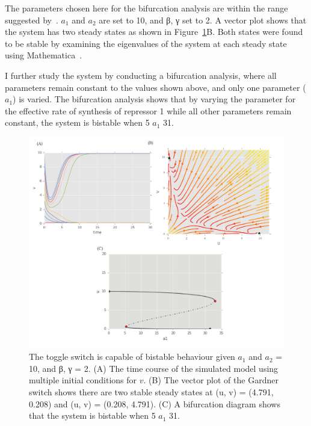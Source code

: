 The parameters chosen here for the bifurcation analysis are within the range suggested by~\textcite{Gardner:2000vha}.  $a_1$ and $a_2$ are set to 10, and β, γ set to 2. A vector plot shows that the system has two steady states as shown in Figure~\ref{fig:Gard_CS}B. Both states were found to be stable by examining the eigenvalues of the system at each steady state using Mathematica~\autocite{mathematica:2016}.


I further study the system by conducting a bifurcation analysis, where all parameters remain constant to the values shown above, and only one parameter ($a_1$) is varied. The bifurcation analysis shows that by varying the parameter for the effective rate of synthesis of repressor 1 while all other parameters remain constant, the system is bistable when 5 \ge{} $a_1$ \le{} 31.



\begin{figure}[htbp]
\centerfloat
\includegraphics[scale=0.7]{../../chapters/chapterABCSysBio/images/Gard_CS.pdf}
\caption[Phase space and bifurcation analysis of the Gardner toggle switch]{\label{fig:Gard_CS}The \textcite{Gardner:2000vha} toggle switch is capable of bistable behaviour given $a_1$ and $a_2$ = 10, and β, γ = 2. (A) The time course of the simulated model using multiple initial conditions for $v$. (B) The vector plot of the Gardner switch shows there are two stable steady states at (u, v) = (4.791, 0.208) and (u, v) = (0.208, 4.791). (C) A bifurcation diagram shows that the system is bistable when 5 \ge{} $a_1$ \le{} 31.}
\end{figure}
\clearpage


